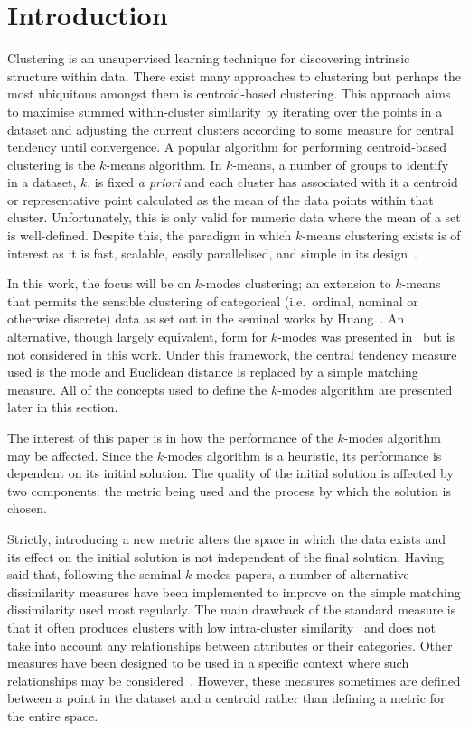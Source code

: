 \section{Introduction}\label{sec:intro}

Clustering is an unsupervised learning technique for discovering intrinsic
structure within data. There exist many approaches to clustering but perhaps the
most ubiquitous amongst them is centroid-based clustering. This approach aims to
maximise summed within-cluster similarity by iterating over the points in a
dataset and adjusting the current clusters according to some measure for central
tendency until convergence. A popular algorithm for performing centroid-based
clustering is the \(k\)-means algorithm. In \(k\)-means, a number of groups to
identify in a dataset, \(k\), is fixed \emph{a priori} and each cluster has
associated with it a centroid or representative point calculated as the mean of
the data points within that cluster. Unfortunately, this is only valid for
numeric data where the mean of a set is well-defined. Despite this, the paradigm
in which \(k\)-means clustering exists is of interest as it is fast, scalable,
easily parallelised, and simple in its design~\cite{Wu2009,Zhao2009}.

In this work, the focus will be on \(k\)-modes clustering; an extension to
\(k\)-means that permits the sensible clustering of categorical (i.e.\ ordinal,
nominal or otherwise discrete) data as set out in the seminal works by
Huang~\cite{Huang1997a,Huang1997b,Huang1998}. An alternative, though largely
equivalent, form for \(k\)-modes was presented in~\cite{Chaturvedi2001} but is
not considered in this work. Under this framework, the central tendency measure
used is the mode and Euclidean distance is replaced by a simple matching
measure. All of the concepts used to define the \(k\)-modes algorithm are
presented later in this section.

The interest of this paper is in how the performance of the \(k\)-modes
algorithm may be affected. Since the \(k\)-modes algorithm is a heuristic, its
performance is dependent on its initial solution. The quality of the initial
solution is affected by two components: the metric being used and the process by
which the solution is chosen.

Strictly, introducing a new metric alters the space in which the data exists and
its effect on the initial solution is not independent of the final solution.
Having said that, following the seminal \(k\)-modes papers, a number of
alternative dissimilarity measures have been implemented to improve on the
simple matching dissimilarity used most regularly. The main drawback of the
standard measure is that it often produces clusters with low intra-cluster
similarity~\cite{Ng2007} and does not take into account any relationships
between attributes or their categories. Other measures have been designed to be
used in a specific context where such relationships may be
considered~\cite{Cao2012,Yu2018,Zhou2016}. However, these measures sometimes are
defined between a point in the dataset and a centroid rather than defining a
metric for the entire space.

